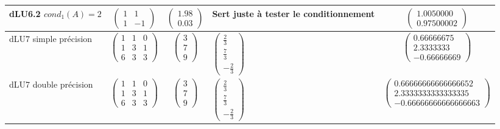\documentclass{article}
\theoremstyle{mes_theoremes}
\begin{document}
\begin{tabular}{|p{}|c|c|p{}|c|}
\hline
 dLU6.2 $cond_1(A)=2$ & $\left(\begin{matrix}1 & 1 \\ 1 & -1  \end{matrix}\right)$ & $\left(\begin{matrix} 1.98\\ 0.03\end{matrix}\right)$ & Sert juste à tester le conditionnement& $\left(\begin{matrix} 1.0050000\\ 0.97500002\end{matrix}\right)$\\
\hline
 dLU7 simple précision & $\left(\begin{matrix}1 & 1 & 0 \\ 1 & 3 & 1\\6 & 3 & 3 \end{matrix}\right)$ & $\left(\begin{matrix} 3\\ 7\\ 9\end{matrix}\right)$ & $\left(\begin{matrix} \frac{2}{3}\\ \frac{7}{3}\\ -\frac{2}{3}\end{matrix}\right)$ & $\left(\begin{matrix} 0.66666675\\ 2.3333333\\ -0.66666669\end{matrix}\right)$\\
\hline
 dLU7 double précision & $\left(\begin{matrix}1 & 1 & 0 \\ 1 & 3 & 1\\6 & 3 & 3 \end{matrix}\right)$ & $\left(\begin{matrix} 3\\ 7\\ 9\end{matrix}\right)$ & $\left(\begin{matrix} \frac{2}{3}\\ \frac{7}{3}\\ -\frac{2}{3}\end{matrix}\right)$ & $\left(\begin{matrix} 0.66666666666666652\\ 2.3333333333333335\\ -0.66666666666666663\end{matrix}\right)$\\
\hline
\end{tabular}
\end{document}
